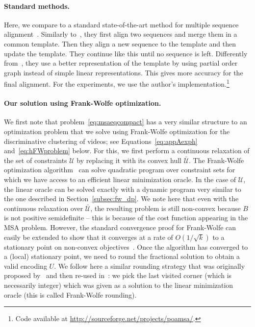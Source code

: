 \documentclass[10pt,twocolumn,letterpaper]{article}
\begin{document}
\paragraph{Standard methods.}
Here, we compare to a standard state-of-the-art method for multiple sequence alignment~\cite{Lee01poa}.
Similarly to~\cite{Higgins88clustal}, they first align two sequences and merge them in a common template.
Then they align a new sequence to the template and then update the template.
They continue like this until no sequence is left.
%
%
Differently from~\cite{Higgins88clustal}, they use a better representation of the template by using partial order graph instead of simple linear representations.
This gives more accuracy for the final alignment.
For the experiments, we use the author's implementation.\footnote{Code available at \url{http://sourceforge.net/projects/poamsa/}.}

\paragraph{Our solution using Frank-Wolfe optimization.}
We first note that problem~\eqref{eq:msaeqcompact} has a very similar 
structure to an optimization problem that we solve using Frank-Wolfe optimization 
for the discriminative clustering of videos; see Equations~\eqref{eq:appAexph} and~\eqref{eq:hFWproblem} below.
For this, we first perform a continuous relaxation of the set of constraints $\mathcal{U}$ by replacing it with its convex hull $\bar{\mathcal{U}}$.
The Frank-Wolfe optimization algorithm~\cite{Jaggi2013} can solve quadratic program over constraint sets
for which we have access to an efficient linear minimization oracle.
In the case of $\mathcal{U}$,
the linear oracle can be solved exactly with a dynamic program very similar to the one described in Section~\ref{subsec:fw_dp}.
We note here that even with the continuous relaxation over $\bar{\mathcal{U}}$, the resulting problem is still non-convex because $B$ is not positive semidefinite -- this is because of the cost function appearing in the MSA problem.
However, the standard convergence proof for Frank-Wolfe can easily be extended to show
that it converges at a rate of $O(1/\sqrt{k})$ to a stationary point on non-convex objectives~.
Once the algorithm has converged to a (local) stationary point,
we need to round the fractional solution to obtain a valid encoding $U$.
We follow here a similar rounding strategy that was originally proposed by~
and then re-used in~\cite{Joulin14efficient}: we pick the last visited
corner (which is necessarily integer) 
which was given as a solution to the linear minimization oracle
(this is called Frank-Wolfe rounding). 
\end{document}
